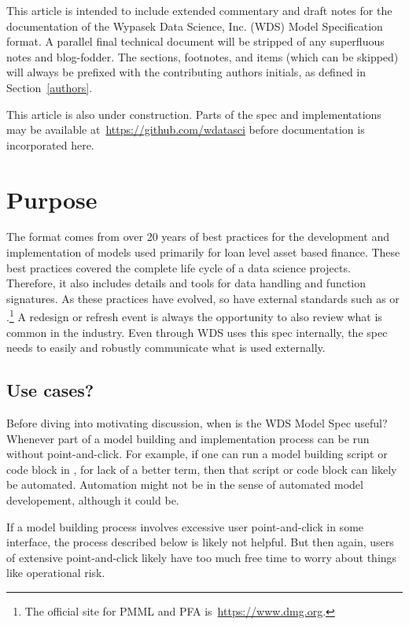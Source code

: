 \documentclass[10pt]{article}
\begin{document}
This article is intended to include extended commentary and draft notes for the documentation of the Wypasek Data Science, Inc. (WDS) Model
Specification format.  A parallel final technical document will be stripped of any superfluous notes and blog-fodder.  
The sections, footnotes, and items (which can be skipped) will always be prefixed with the 
contributing authors initials, as defined in Section~\ref{authors}.  

This article is also under construction.  Parts of the spec and implementations may be available at~\url{https://github.com/wdatasci} before
documentation is incorporated here.

\fi

\section{Purpose\label{purpose}}

The  format comes from over 20 years of best practices for the development and implementation of models used primarily for
loan level asset based finance.  These best practices covered the complete life cycle of a data science projects.  Therefore, it also
includes details and tools for data handling and function signatures.  As these practices have evolved, so have external standards such as
 or .\footnote{The official site for PMML and PFA is~\url{https://www.dmg.org}.} A redesign or refresh event is always the
opportunity to also review what is common in the industry.   Even through WDS uses this spec internally, the spec needs to easily and
robustly communicate what is used externally.

\subsection{Use cases?}

Before diving into motivating discussion, when is the WDS Model Spec useful?  Whenever part of a model building and implementation process
can be run without point-and-click.  For example, if one can run a model building script or code block in , for lack 
of a better term, then that script or code block can likely be automated.  Automation might not be in the sense of automated model
developement, although it could be.  

If a model building process involves excessive user point-and-click in some interface, the process described below is likely not helpful.
But then again, users of extensive point-and-click likely have too much free time to worry about things like operational risk.
\end{document}

